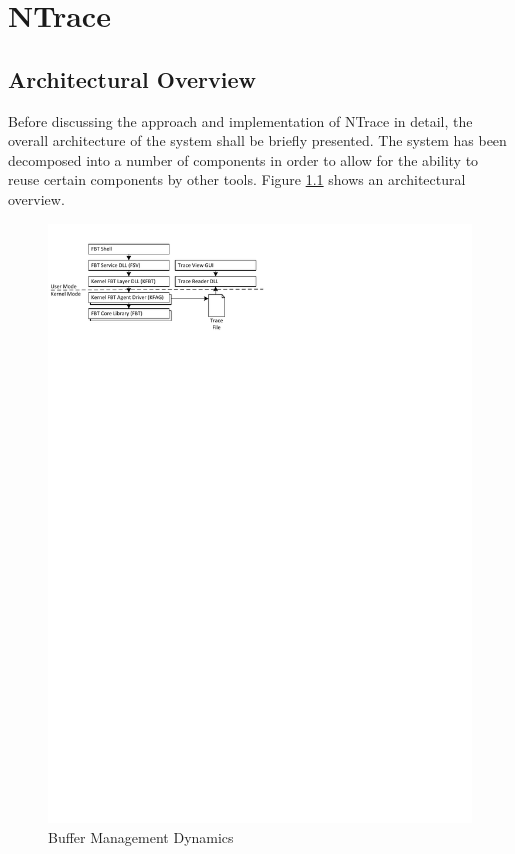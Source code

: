 \part{NTrace}
 
\chapter{Architectural Overview}
Before discussing the approach and implementation of NTrace in detail, the overall architecture
of the system shall be briefly presented. The system has been decomposed into a number of 
components in order to allow for the ability to reuse certain components by
other tools. Figure \ref{Architecture} shows an architectural overview.

\begin{figure}[h] 
\begin{centering} 
\includegraphics[scale=1, clip=true, viewport=0cm 24cm 11cm 30cm]{images/diagrams/Architecture.pdf} 
\caption{Buffer Management Dynamics} 
\label{Architecture} 
\end{centering} 
\end{figure}

